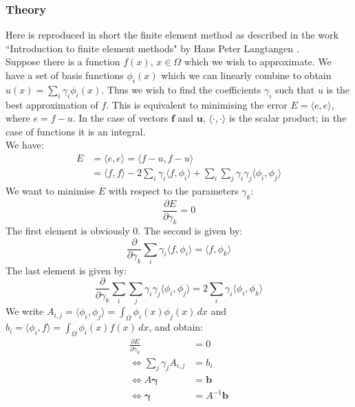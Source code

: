 \documentclass[a4paper,12pt]{article}
\begin{document}
\subsubsection{Theory}
Here is reproduced in short the finite element method as described in the work ``Introduction to finite element methods" by Hans Peter Langtangen \cite{fem_paper}.\\
Suppose there is a function $f(x)$, $x \in \Omega$ which we wish to approximate. We have a set of basis functions $\phi_i(x)$ which we can linearly combine to obtain $u(x) = \sum_i \gamma_i \phi_i(x)$. Thus we wish to find the coefficients $\gamma_i$ such that $u$ is the best approximation of $f$. This is equivalent to minimising the error $E = \langle e,e\rangle$, where $e = f - u$. In the case of vectors $\mathbf{f}$ and $\mathbf{u}$, $\langle\cdot,\cdot\rangle$ is the scalar product; in the case of functions it is an integral.\\
We have:
\begin{equation}
\begin{split}
    E &= \langle e,e\rangle = \langle f-u, f-u\rangle \\
    &= \langle f,f\rangle - 2\sum_i \gamma_i \langle f,\phi_i\rangle + \sum_i\sum_j \gamma_i \gamma_j \langle\phi_i,\phi_j\rangle
\end{split}
\end{equation}
We want to minimise $E$ with respect to the parameters $\gamma_k$:
\begin{equation}
    \frac{\partial E}{\partial \gamma_k} = 0
\end{equation}
The first element is obviously 0. The second is given by:
\begin{equation}
    \frac{\partial}{\partial \gamma_k} \sum_i \gamma_i \langle f,\phi_i\rangle = \langle f,\phi_k\rangle
\end{equation}
The last element is given by:
\begin{equation}
    \frac{\partial}{\partial \gamma_k}\sum_i\sum_j \gamma_i \gamma_j \langle\phi_i,\phi_j\rangle = 2 \sum_i \gamma_i \langle\phi_i,\phi_k\rangle
\end{equation}
We write $A_{i,j} = \langle\phi_i,\phi_j\rangle = \int_{\Omega} \phi_i(x) \phi_j(x) \,dx$ and $b_i = \langle\phi_i,f\rangle = \int_{\Omega} \phi_i(x) f(x) \,dx$, and obtain:
\begin{align}
    \frac{\partial E}{\partial \gamma_k} &= 0 \\
    \iff \sum_j \gamma_j A_{i,j} &= b_i \\
    \iff A \boldsymbol{\gamma} &= \mathbf{b} \\
    \iff \boldsymbol{\gamma} &= A^{-1} \mathbf{b}
\end{align}
\end{document}
